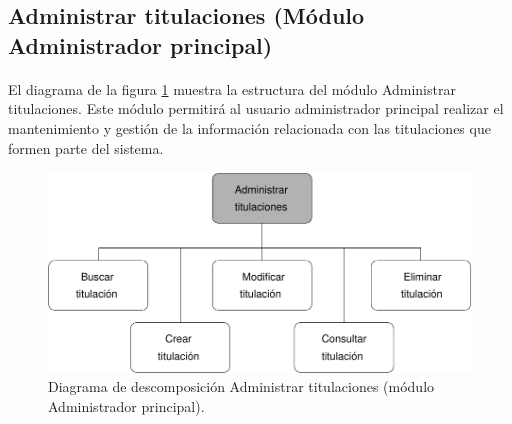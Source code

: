 \subsection{Administrar titulaciones (Módulo Administrador principal)}

  \paragraph{}El diagrama de la figura
  \ref{diagramaDescomposicionAdministrarTitulaciones} muestra la estructura del
  módulo Administrar titulaciones. Este módulo permitirá al usuario
  administrador principal realizar el mantenimiento y gestión de la información
  relacionada con las titulaciones que formen parte del sistema.


  \begin{figure}[!ht]
    \begin{center}
      \includegraphics[]{11.Disenyo_Arquitectonico/11.2.Diagramas_Descomposicion/11.2.2.Modulo_administrador_principal/AdministrarBBDD/AdministrarTitulaciones/Diagramas/administrar_titulaciones.pdf}
      \caption{Diagrama de descomposición Administrar titulaciones (módulo Administrador principal).}
      \label{diagramaDescomposicionAdministrarTitulaciones}
    \end{center}
  \end{figure}
